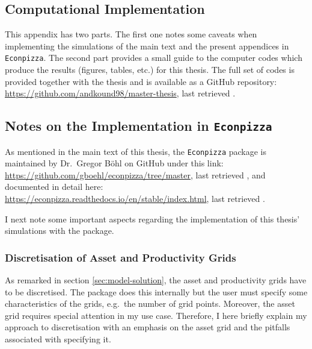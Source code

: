 \documentclass[a4paper,12pt]{article} %
\numberwithin{equation}{section} %
\numberwithin{figure}{section}
\numberwithin{table}{section}
\begin{document}
\begin{refsection}
\begin{appendices}
\section{Computational Implementation}
\label{sec-app:codes}

This appendix has two parts. The first one notes some caveats when implementing the simulations of the main text and the present appendices in \texttt{Econpizza}. The second part provides a small guide to the computer codes which produce the results (figures, tables, etc.) for this thesis. The full set of codes is provided together with the thesis and is available as a GitHub repository: \url{https://github.com/andkound98/master-thesis}, last retrieved .

\subsection{Notes on the Implementation in \texttt{Econpizza}}
\label{sec-app:codes-ep}

As mentioned in the main text of this thesis, the \texttt{Econpizza} package is maintained by Dr.~Gregor Böhl on GitHub under this link: \url{https://github.com/gboehl/econpizza/tree/master}, last retrieved , and documented in detail here: \url{https://econpizza.readthedocs.io/en/stable/index.html}, last retrieved .

I next note some important aspects regarding the implementation of this thesis' simulations with the package.

\subsubsection*{Discretisation of Asset and Productivity Grids}

As remarked in section \ref{sec:model-solution}, the asset and productivity grids have to be discretised. The package does this internally but the user must specify some characteristics of the grids, e.g.~the number of grid points. Moreover, the asset grid requires special attention in my use case. Therefore, I here briefly explain my approach to discretisation with an emphasis on the asset grid and the pitfalls associated with specifying it.


\end{appendices}
\end{refsection}
\end{document}
